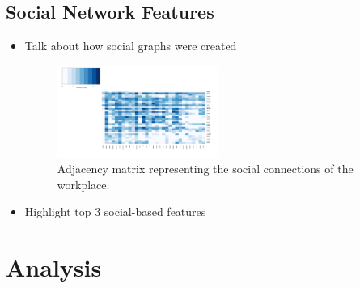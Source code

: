 \documentclass{article}
\begin{document}
\subsection{Social Network Features}
\begin{itemize}
\item Talk about how social graphs were created
\begin{figure}[H]
    \centering
        \includegraphics[width=0.5\textwidth]{adj_matrix}
        \caption{Adjacency matrix representing the social connections of the workplace.}
        \label{fig:var_imp}
\end{figure}
\item Highlight top 3 social-based features
\end{itemize}

\section{Analysis} \label{Analysis}
\end{document}
